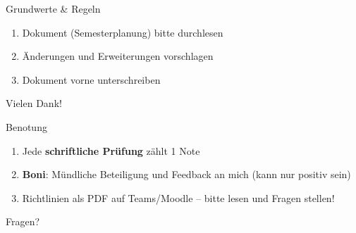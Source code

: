 \begin{frame}{Grundwerte \& Regeln}
    \begin{enumerate}
        \item Dokument (Semesterplanung) bitte durchlesen
        \item Änderungen und Erweiterungen vorschlagen
        \item Dokument vorne unterschreiben
    \end{enumerate}
    Vielen Dank!
\end{frame}

\begin{frame}
\end{frame}

\begin{frame}{Benotung}
    \begin{enumerate}[<+->]
        \item[\faPen] Jede \textbf{schriftliche Prüfung} zählt 1 Note
        \item[\faMoneyBill] \textbf{Boni}: Mündliche Beteiligung und Feedback an mich (kann nur positiv sein)
        \item[\faFilePdf] Richtlinien als PDF auf Teams/Moodle -- bitte lesen und Fragen stellen!
    \end{enumerate}
\end{frame}

\begin{frame}{\faQuestionCircle}\Huge
    \begin{center}
        Fragen?
    \end{center}
\end{frame}

